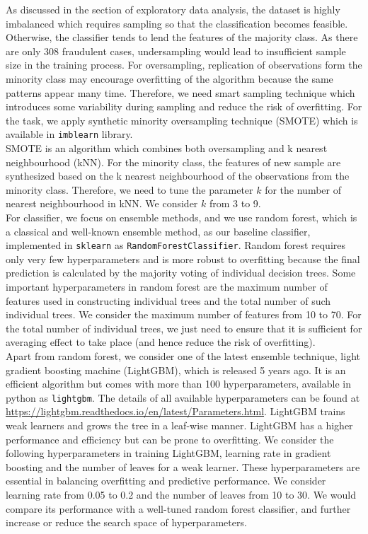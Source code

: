 \documentclass[12pt]{article}
\begin{document}
As discussed in the section of exploratory data analysis, the dataset is highly imbalanced which requires sampling so that the classification becomes feasible. Otherwise, the classifier tends to lend the features of the majority class. As there are only 308 fraudulent cases, undersampling would lead to insufficient sample size in the training process. For oversampling, replication of observations form the minority class may encourage overfitting of the algorithm because the same patterns appear many time. Therefore, we need smart sampling technique which introduces some variability during sampling and reduce the risk of overfitting. For the task, we apply synthetic minority oversampling technique (SMOTE) which is available in \texttt{imblearn} library.\\ 


SMOTE is an algorithm which combines both oversampling and k nearest neighbourhood (kNN). For the minority class, the features of new sample are synthesized based on the k nearest neighbourhood of the observations from the minority class. Therefore, we need to tune the parameter $k$ for the number of nearest neighbourhood in kNN. We consider $k$ from 3 to 9.\\

For classifier, we focus on ensemble methods, and we use random forest, which is a classical and well-known ensemble method, as our baseline classifier, implemented in \texttt{sklearn} as \texttt{RandomForestClassifier}. Random forest requires only very few hyperparameters and is more robust to overfitting because the final prediction is calculated by the majority voting of individual decision trees. Some important hyperparameters in random forest are the maximum number of features used in constructing individual trees and the total number of such individual trees. We consider the maximum number of features from 10 to 70. For the total number of individual trees, we just need to ensure that it is sufficient for averaging effect to take place (and hence reduce the risk of overfitting).\\

Apart from random forest, we consider one of the latest ensemble technique, light gradient boosting machine (LightGBM), which is released 5 years ago. It is an efficient algorithm but comes with more than 100 hyperparameters, available in python as \texttt{lightgbm}. The details of all available hyperparameters can be found at \url{https://lightgbm.readthedocs.io/en/latest/Parameters.html}. LightGBM trains weak learners and grows the tree in a leaf-wise manner. LightGBM has a higher performance and efficiency but can be prone to overfitting. We consider the following hyperparameters in training LightGBM, learning rate in gradient boosting and the number of leaves for a weak learner. These hyperparameters are essential in balancing overfitting and predictive performance. We consider learning rate from 0.05 to 0.2 and the number of leaves from 10 to 30. We would compare its performance with a well-tuned random forest classifier, and further increase or reduce the search space of hyperparameters. 
\end{document}
